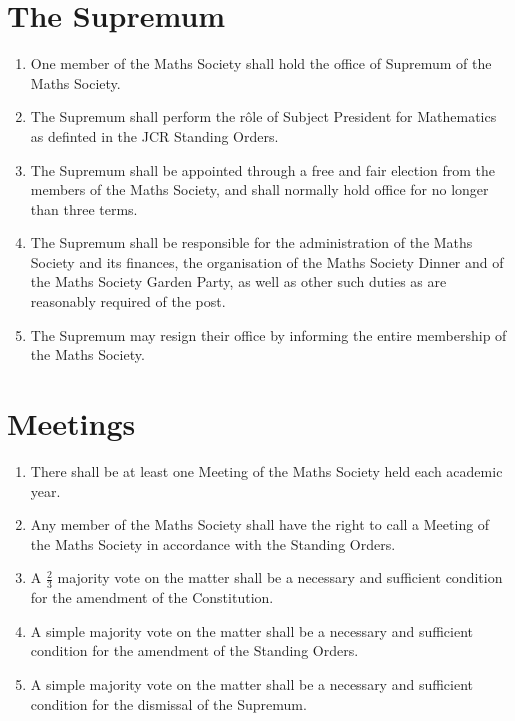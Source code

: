 \documentclass[pdftex,a4paper]{report}
\begin{document}
\begin{enumerate}[label=\Roman*)]
\end{enumerate}


\section*{The Supremum}

\begin{enumerate}[resume*]
	\item One member of the Maths Society shall hold the office of Supremum of the Maths Society.
	\item The Supremum shall perform the r\^ole of Subject President for Mathematics as definted in the JCR Standing Orders.
	\item The Supremum shall be appointed through a free and fair election from the members of the Maths Society, and shall normally hold office for no longer than three terms.
	\item The Supremum shall be responsible for the administration of the Maths Society and its finances, the organisation of the Maths Society Dinner and of the Maths Society Garden Party, as well as other such duties as are reasonably required of the post.
	\item The Supremum may resign their office by informing the entire membership of the Maths Society.
\end{enumerate}


\section*{Meetings}

\begin{enumerate}[resume*]
	\item There shall be at least one Meeting of the Maths Society held each academic year.
	\item Any member of the Maths Society shall have the right to call a Meeting of the Maths Society in accordance with the Standing Orders.
	\item A $\frac{2}{3}$ majority vote on the matter shall be a necessary and sufficient condition for the amendment of the Constitution.
	\item A simple majority vote on the matter shall be a necessary and sufficient condition for the amendment of the Standing Orders.
	\item A simple majority vote on the matter shall be a necessary and sufficient condition for the dismissal of the Supremum.
\end{enumerate}
\end{document}
